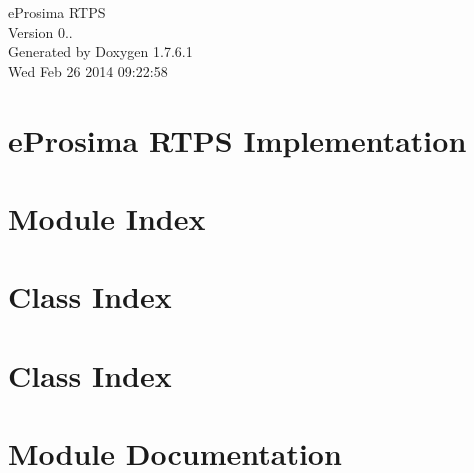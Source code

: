 \documentclass[a4paper]{book}
\begin{document}
\hypersetup{pageanchor=false,citecolor=blue}
\begin{titlepage}
\vspace*{7cm}
\begin{center}
{\Large e\-Prosima \-R\-T\-P\-S \\[1ex]\large \-Version 0.. }\\
\vspace*{1cm}
{\large \-Generated by Doxygen 1.7.6.1}\\
\vspace*{0.5cm}
{\small Wed Feb 26 2014 09:22:58}\\
\end{center}
\end{titlepage}
\clearemptydoublepage
{}
\tableofcontents
\clearemptydoublepage
{}
\hypersetup{pageanchor=true,citecolor=blue}
\chapter{e\-Prosima \-R\-T\-P\-S \-Implementation}
\label{index}\hypertarget{index}{}
\chapter{\-Module \-Index}

\chapter{\-Class \-Index}

\chapter{\-Class \-Index}

\chapter{\-Module \-Documentation}


\end{document}
